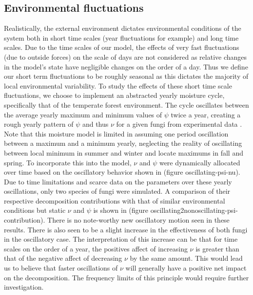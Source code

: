 \documentclass[12pt]{article}
\begin{document}
\begin{multicols}{2}
\subsection{Environmental fluctuations}
Realistically, the external environment dictates environmental conditions of the system both in short time scales (year fluctuations for example) and long time scales. Due to the time scales of our model, the effects of very fast fluctuations (due to outside forces) on the scale of days are not considered as relative changes in the model's state have negligible changes on the order of a day. Thus we define our short term fluctuations to be roughly seasonal as this dictates the majority of local environmental variability. To study the effects of these short time scale fluctuations, we choose to implement an abstracted yearly moisture cycle, specifically that of the temperate forest environment. The cycle oscillates between the average yearly maximum and minimum values of $\psi$ twice a year, creating a rough yearly pattern of $\psi$ and thus $\nu$ for a given fungi from experimental data \cite{Zobel2001}\cite{Maynard2019}. Note that this moisture model is limited in assuming one period oscillation between a maximum and a minimum yearly, neglecting the reality of oscillating between local minimum in summer and winter and locate maximums in fall and spring. To incorporate this into the model, $\nu$ and $\psi$ were dynamically allocated over time based on the oscillatory behavior shown in (figure oscillating-psi-nu). Due to time limitations and scarce data on the parameters over these yearly oscillations, only two species of fungi were simulated. A comparison of their respective decomposition contributions with that of similar environmental conditions but static $\nu$ and $\psi$ is shown in (figure oscillating2nonoscillating-psi-contribution). There is no note-worthy new oscillatory motion seen in these results. There is also seen to be a slight increase in the effectiveness of both fungi in the oscillatory case. The interpretation of this increase can be that for time scales on the order of a year, the positives affect of increasing $\nu$ is greater than that of the negative affect of decreasing $\nu$ by the same amount. This would lead us to believe that faster oscillations of $\nu$ will generally have a positive net impact on the decomposition. The frequency limits of this principle would require further investigation. 



\end{multicols}
\end{document}
